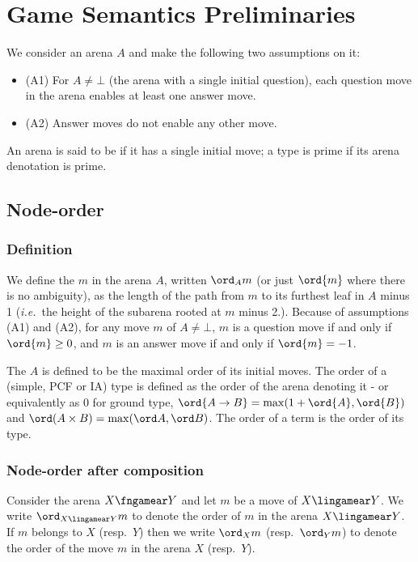 
\section{Game Semantics Preliminaries}

We consider an arena $A$ and make the following two assumptions on it:
\begin{itemize}
\item (A1) For $A \neq \bot$ (the arena with a single initial question), each question move in the arena enables at least one answer move.
\item (A2) Answer moves do not enable any other move.
\end{itemize}

An arena is said to be  if it has a single initial move; a type is prime if its arena denotation is prime.

\subsection{Node-order}

\subsubsection{Definition}

We define the  $m$ in the arena $A$, written $\ord_A{m}$ (or just $\ord{m}$ where there is no ambiguity), as the length of the path from $m$ to its furthest leaf in $A$ minus 1
({\it i.e.}~the height of the subarena rooted at $m$ minus 2.). Because of assumptions (A1) and (A2),
for any move $m$ of $A \neq \bot$, $m$ is a question move if and only if $\ord{m} \geq 0$, and $m$ is an answer move if and only if $\ord{m} = -1$.

The  $A$ is defined to be the maximal order of its initial moves. The order of a (simple, PCF or IA) type is defined as the order of the arena denoting it - or equivalently as 0 for ground type, $\ord{A\rightarrow B} = \max(1+\ord{A},\ord{B})$ and $\ord(A\times B) = \max(\ord A, \ord B)$. The order of a term is the order of its type.


\subsubsection{Node-order after composition}

Consider the arena $X\fngamear Y$ and let $m$ be a move of
$X\lingamear Y$. We write $\ord_{X\lingamear Y}{m}$ to denote the
order of $m$ in the arena ${X\lingamear Y}$. If $m$ belongs to $X$
(resp.~$Y$) then we write $\ord_X{m}$ (resp.~$\ord_Y{m}$) to denote
the order of the move $m$ in the arena $X$ (resp.~$Y$).

